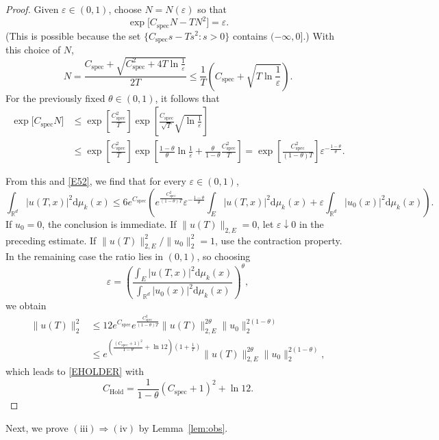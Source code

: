 \documentclass[12pt]{article}
\begin{document}
\begin{proof}
Given $\varepsilon \in (0,1)$, choose $N = N(\varepsilon)$ so that
\[
\exp\big[C_{\mathrm{spec}}N - TN^2\big] = \varepsilon.
\]
(This is possible because the set $\{C_{\mathrm{spec}}s - Ts^2: s > 0\}$ contains $(-\infty,0]$.) With this choice of $N$,
\[
N = \frac{C_{\mathrm{spec}} + \sqrt{C_{\mathrm{spec}}^2 + 4T\ln\frac{1}{\varepsilon}}}{2T}
\le \frac{1}{T}\left(C_{\mathrm{spec}} + \sqrt{T\ln\frac{1}{\varepsilon}}\right).
\]
For the previously fixed $\theta \in (0,1)$, it follows that
\begin{align*}
\exp\big[C_{\mathrm{spec}}N\big]
&\le \exp\left[\frac{C_{\mathrm{spec}}^2}{T}\right]
\exp\left[\frac{C_{\mathrm{spec}}}{\sqrt{T}}\sqrt{\ln\frac{1}{\varepsilon}}\right] \\
&\le \exp\left[\frac{C_{\mathrm{spec}}^2}{T}\right]
\exp\left[\frac{1-\theta}{\theta}\ln\frac{1}{\varepsilon} + \frac{\theta}{1-\theta}\frac{C_{\mathrm{spec}}^2}{T}\right]
= \exp\left[\frac{C_{\mathrm{spec}}^2}{(1-\theta)T}\right] \varepsilon^{-\frac{1-\theta}{\theta}}.
\end{align*}


From this and \eqref{E52}, we find that for every $\varepsilon \in (0,1)$,
\[
\int_{\mathbb{R}^d} |u(T,x)|^2 \mathrm{d}\mu_k(x)
\le 6e^{C_{\mathrm{spec}}}
\left(
e^{\frac{C_{\mathrm{spec}}^2}{(1-\theta)T}} \varepsilon^{-\frac{1-\theta}{\theta}}
\int_{E} |u(T,x)|^2 \mathrm{d}\mu_k(x)
+ \varepsilon \int_{\mathbb{R}^d} |u_0(x)|^2 \mathrm{d}\mu_k(x)
\right).
\]
If $u_0=0$, the conclusion is immediate. If $\|u(T)\|_{2,E}=0$,
let $\varepsilon\downarrow0$ in the preceding estimate. If
$\|u(T)\|_{2,E}^2/\|u_0\|_2^2=1$, use the contraction property.
In the remaining case the ratio lies in $(0,1)$, so choosing
\[
\varepsilon = \left(
\frac{\int_{E} |u(T,x)|^2 \mathrm{d}\mu_k(x)}{\int_{\mathbb{R}^d} |u_0(x)|^2 \mathrm{d}\mu_k(x)}
\right)^{\theta},
\]
we obtain
\begin{align*}
\|u(T)\|_2^2
&\le 12e^{C_{\mathrm{spec}}}
 e^{\frac{C_{\mathrm{spec}}^2}{(1-\theta)T}}
 \|u(T)\|_{2,E}^{2\theta}\|u_0\|_2^{2(1-\theta)}\\
&\le e^{\left(\frac{(C_{\mathrm{spec}}+1)^2}{1-\theta}+\ln12\right)
                   \left(1+\frac1T\right)}
 \|u(T)\|_{2,E}^{2\theta}\|u_0\|_2^{2(1-\theta)},
\end{align*}
which leads to \eqref{EHOLDER} with
\[
C_{\mathrm{Hold}} = \frac{1}{1-\theta}(C_{\mathrm{spec}}+1)^2 + \ln 12.
\]
\end{proof}


Next, we prove $(\mathrm{iii}) \Rightarrow (\mathrm{iv})$  by Lemma~\ref{lem:obs}.
\end{document}
